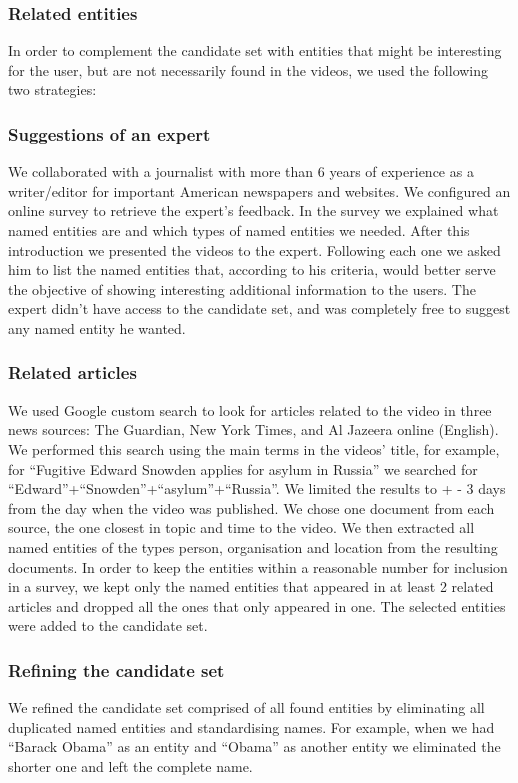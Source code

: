 \documentclass{llncs}
\begin{document}
\subsubsection{Related entities }
In order to complement the candidate set with entities that might be interesting for the user, but are not necessarily found in the videos, we used the following two strategies:

\subsubsection{Suggestions of an expert}
We collaborated with a journalist with more than 6 years of experience as a writer/editor for important American newspapers and websites.  We configured an online survey to retrieve the expert’s feedback. In the survey we explained what named entities are and which types of named entities we needed. After this introduction we presented the videos to the expert. Following each one we asked him to list the named entities that, according to his criteria, would better serve the objective of showing interesting additional information to the users. The expert didn’t have access to the candidate set, and was completely free to suggest any named entity he wanted. 

\subsubsection{Related articles}
We used Google custom search to look for articles related to the video in three news sources: The Guardian, New York Times, and Al Jazeera online (English). We performed this search using the main terms in the videos’ title, for example, for ``Fugitive Edward Snowden applies for asylum in Russia'' we searched for  ``Edward''+``Snowden''+``asylum''+``Russia''. We limited the results to + - 3 days from the day when the video was published. We chose one document from each source, the one closest in topic and time to the video. We then extracted all named entities of the types person, organisation and location from the resulting documents. In order to keep the entities within a reasonable number for inclusion in a survey, we kept only the named entities that appeared in at least 2 related articles and dropped all the ones that only appeared in one.  The selected entities were added to the candidate set. 

\subsubsection{Refining the candidate set}
We refined the candidate set  comprised of all found entities by eliminating all duplicated named entities and standardising names. For example, when we had ``Barack Obama'' as an entity and ``Obama'' as another entity we eliminated the shorter one and left the complete name. 
	
\end{document}
